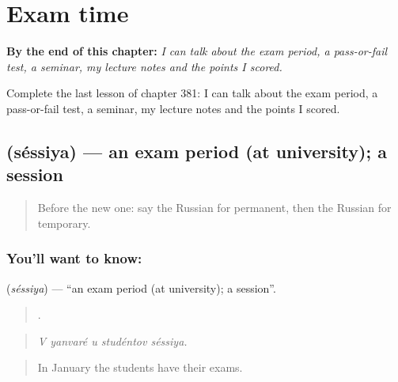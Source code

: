 
\chapter{Exam time}
\label{ch:ru-exam-time}

\begin{chapteropening}
\textbf{By the end of this chapter:} \emph{I can talk about the exam period, a pass-or-fail test, a seminar, my lecture notes and the points I scored.}

Complete the last lesson of chapter 381: I can talk about the exam period, a pass-or-fail test, a seminar, my lecture notes and the points I scored.
\end{chapteropening}

\section[\texorpdfstring{\ru{сессия} (séssiya)}{сессия (séssiya)}]{ (séssiya) — an exam period (at university); a session}

\label{lesson:RU-C381-sessiya}



\begin{quote}
Before the new one: say the Russian for permanent, then the Russian for temporary.
\end{quote}

\subsection*{You'll want to know: }
\textbf{} (\emph{séssiya}) — \textquotedblleft{}an exam period (at university); a session\textquotedblright{}.

\begin{quote}
    .
\end{quote}

\begin{quote}
\emph{V yanvaré u studéntov séssiya.}
\end{quote}

\begin{quote}
In January the students have their exams.
\end{quote}

